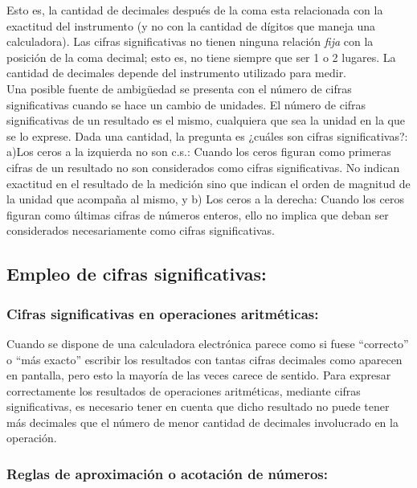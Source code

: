 Esto es, la cantidad de  decimales  después  de  la  coma  esta  
relacionada  con  la  exactitud  del  instrumento  (y  no  con  la cantidad de dígitos que maneja una calculadora). Las cifras 
significativas no tienen ninguna relación \textit{fija} con la posición de la coma decimal; esto es, no tiene siempre que ser 1 o 
2 lugares.  La cantidad de decimales depende del instrumento utilizado para medir.\\


Una posible fuente de ambigüedad se presenta con el número de cifras significativas cuando se hace  un  cambio  de  unidades. El  
número  de  cifras  significativas  de  un  resultado  es  el  mismo, cualquiera que sea la unidad en la que se lo exprese. Dada 
una cantidad, la pregunta es ¿cuáles son cifras significativas?: a)Los  ceros  a  la  izquierda no  son  c.s.: Cuando  los  ceros  
figuran  como  primeras  cifras  de  un resultado  no  son  considerados  como  cifras  significativas. No  indican  exactitud  en 
 el resultado de la medición sino que indican el orden de magnitud de la unidad que acompaña al mismo, y b) Los  ceros  a  la  
derecha: Cuando  los  ceros  figuran  como  últimas  cifras  de  números  enteros, ello no implica que deban ser considerados 
necesariamente como cifras significativas.

\subsection{Empleo de cifras significativas:}


\subsubsection{Cifras significativas en operaciones aritméticas:}

Cuando se dispone de una calculadora electrónica parece como si fuese ``correcto'' o ``más exacto'' escribir los resultados con 
tantas cifras decimales como aparecen en pantalla, pero esto la mayoría de las veces carece de sentido. Para expresar 
correctamente los resultados de operaciones aritméticas, mediante cifras significativas, es necesario tener en cuenta que dicho 
resultado no puede tener más decimales que el número de menor cantidad de decimales involucrado en la operación.

\subsubsection{Reglas de aproximación o acotación de números:} 

